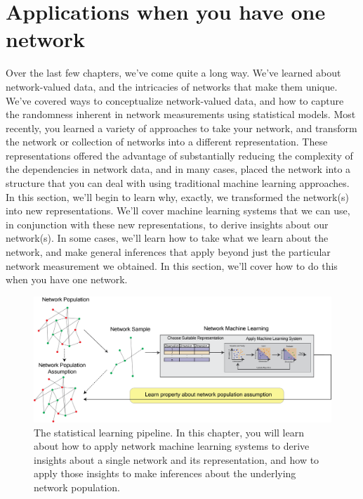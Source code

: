 \chapter{Applications when you have one network}
\label{sec:ch7}

Over the last few chapters, we've come quite a long way. We've learned about network-valued data, and the intricacies of networks that make them unique. We've covered ways to conceptualize network-valued data, and how to capture the randomness inherent in network measurements using statistical models. Most recently, you learned a variety of approaches to take your network, and transform the network or collection of networks into a different representation. These representations offered the advantage of substantially reducing the complexity of the dependencies in network data, and in many cases, placed the network into a structure that you can deal with using traditional machine learning approaches. In this section, we'll begin to learn why, exactly, we transformed the network(s) into new representations. We'll cover machine learning systems that we can use, in conjunction with these new representations, to derive insights about our network(s). In some cases, we'll learn how to take what we learn about the network, and make general inferences that apply beyond just the particular network measurement we obtained. In this section, we'll cover how to do this when you have one network.

\begin{figure}[h]
    \centering
    \includegraphics[width=\linewidth]{applications/ch7/Images/applications.png}
    \caption[Network machine learning applications schematic]{The statistical learning pipeline. In this chapter, you will learn about how to apply network machine learning systems to derive insights about a single network and its representation, and how to apply those insights to make inferences about the underlying network population.}
    \label{fig:ch7:netapps}
\end{figure}

